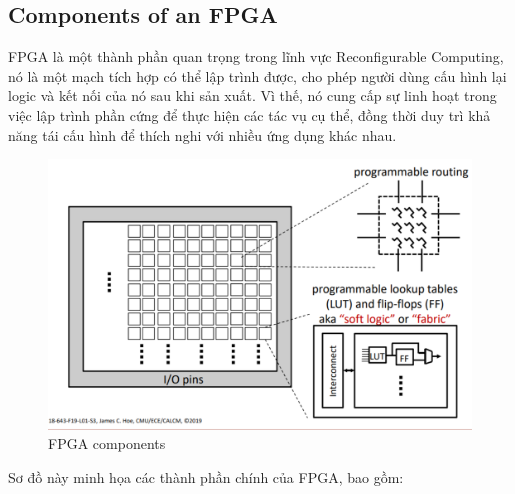 \documentclass[a4paper]{article}
\begin{document}
\subsection{Components of an FPGA}
FPGA là một thành phần quan trọng trong lĩnh vực Reconfigurable Computing, nó là một mạch tích hợp có thể lập trình được, cho phép người dùng cấu hình lại logic và kết nối của nó sau khi sản xuất. Vì thế, nó cung cấp sự linh hoạt trong việc lập trình phần cứng để thực hiện các tác vụ cụ thể, đồng thời duy trì khả năng tái cấu hình để thích nghi với nhiều ứng dụng khác nhau.
\begin{figure}[H]
    \centering
    \includegraphics[width=1\linewidth]{assets/fpag.png}
    \caption{FPGA components}
    \label{fig:enter-label}
\end{figure}
Sơ đồ này minh họa các thành phần chính của FPGA, bao gồm:
\end{document}

